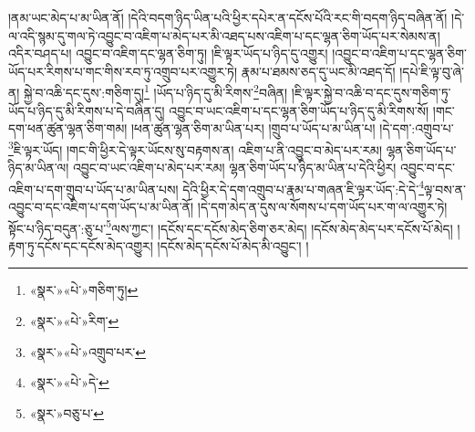 །ནམ་ཡང་མེད་པ་མ་ཡིན་ནོ། །དེའི་བདག་ཉིད་ཡིན་པའི་ཕྱིར་དཔེར་ན་དངོས་པོའི་རང་གི་བདག་ཉིད་བཞིན་ནོ། །དེ་ལ་འདི་སྙམ་དུ་གལ་ཏེ་འབྱུང་བ་འཇིག་པ་མེད་པར་མི་འཐད་པས་འཇིག་པ་དང་ལྷན་ཅིག་ཡོད་པར་སེམས་ན། འདིར་བཤད་པ། འབྱུང་བ་འཇིག་དང་ལྷན་ཅིག་ཏུ། །ཇི་ལྟར་ཡོད་པ་ཉིད་དུ་འགྱུར། །འབྱུང་བ་འཇིག་པ་དང་ལྷན་ཅིག་ཡོད་པར་རིགས་པ་གང་གིས་རབ་ཏུ་འགྲུབ་པར་འགྱུར་ཏེ། རྣམ་པ་ཐམས་ཅད་དུ་ཡང་མི་འཐད་དོ། །དཔེ་ཇི་ལྟ་བུ་ཞེ་ན། སྐྱེ་བ་འཆི་དང་དུས་:གཅིག་དུ།\footnote{«སྣར་»«པེ་»གཅིག་ཏུ།} །ཡོད་པ་ཉིད་དུ་མི་རིགས་\footnote{«སྣར་»«པེ་»རིག་}བཞིན། །ཇི་ལྟར་སྐྱེ་བ་འཆི་བ་དང་དུས་གཅིག་ཏུ་ཡོད་པ་ཉིད་དུ་མི་རིགས་པ་དེ་བཞིན་དུ། འབྱུང་བ་ཡང་འཇིག་པ་དང་ལྷན་ཅིག་ཡོད་པ་ཉིད་དུ་མི་རིགས་སོ། །གང་དག་ཕན་ཚུན་ལྷན་ཅིག་གམ། །ཕན་ཚུན་ལྷན་ཅིག་མ་ཡིན་པར། །གྲུབ་པ་ཡོད་པ་མ་ཡིན་པ། །དེ་དག་:འགྲུབ་པ་\footnote{«སྣར་»«པེ་»འགྲུབ་པར་}ཇི་ལྟར་ཡོད། །གང་གི་ཕྱིར་དེ་ལྟར་ཡོངས་སུ་བརྟགས་ན། འཇིག་པ་ནི་འབྱུང་བ་མེད་པར་རམ། ལྷན་ཅིག་ཡོད་པ་ཉིད་མ་ཡིན་ལ། འབྱུང་བ་ཡང་འཇིག་པ་མེད་པར་རམ། ལྷན་ཅིག་ཡོད་པ་ཉིད་མ་ཡིན་པ་དེའི་ཕྱིར། འབྱུང་བ་དང་འཇིག་པ་དག་གྲུབ་པ་ཡོད་པ་མ་ཡིན་པས། དེའི་ཕྱིར་དེ་དག་འགྲུབ་པ་རྣམ་པ་གཞན་ཇི་ལྟར་ཡོད་:དེ་དེ་\footnote{«སྣར་»«པེ་»དེ་}ལྟ་བས་ན་འབྱུང་བ་དང་འཇིག་པ་དག་ཡོད་པ་མ་ཡིན་ནོ། །དེ་དག་མེད་ན་དུས་ལ་སོགས་པ་དག་ཡོད་པར་ག་ལ་འགྱུར་ཏེ། སྟོང་པ་ཉིད་བདུན་:ཅུ་པ་\footnote{«སྣར་»བཅུ་པ་}ལས་ཀྱང་། །དངོས་དང་དངོས་མེད་ཅིག་ཅར་མེད། །དངོས་མེད་མེད་པར་དངོས་པོ་མེད། །རྟག་ཏུ་དངོས་དང་དངོས་མེད་འགྱུར། །དངོས་མེད་དངོས་པོ་མེད་མི་འབྱུང་། །
